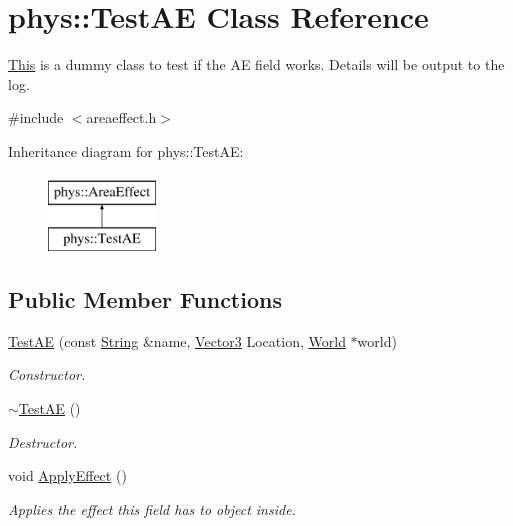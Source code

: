 \hypertarget{classphys_1_1TestAE}{
\section{phys::TestAE Class Reference}
\label{d1/dca/classphys_1_1TestAE}
}


\hyperlink{structThis}{This} is a dummy class to test if the AE field works. Details will be output to the log.  




{\ttfamily \#include $<$areaeffect.h$>$}

Inheritance diagram for phys::TestAE:\begin{figure}[H]
\begin{center}
\leavevmode
\includegraphics[height=2cm]{d1/dca/classphys_1_1TestAE}
\end{center}
\end{figure}
\subsection*{Public Member Functions}
\begin{DoxyCompactItemize}
\item 
\hyperlink{classphys_1_1TestAE_a90e5678a05179482d08fc9abd94fe9d6}{TestAE} (const \hyperlink{namespacephys_aa03900411993de7fbfec4789bc1d392e}{String} \&name, \hyperlink{classphys_1_1Vector3}{Vector3} Location, \hyperlink{classphys_1_1World}{World} $\ast$world)
\begin{DoxyCompactList}\small\item\em Constructor. \item\end{DoxyCompactList}\item 
\hyperlink{classphys_1_1TestAE_aa3ceb77df713b5cafa97495de61e4b0a}{$\sim$TestAE} ()
\begin{DoxyCompactList}\small\item\em Destructor. \item\end{DoxyCompactList}\item 
void \hyperlink{classphys_1_1TestAE_a191c60dbfa277e850ea392d9ab774c42}{ApplyEffect} ()
\begin{DoxyCompactList}\small\item\em Applies the effect this field has to object inside. \item\end{DoxyCompactList}\end{DoxyCompactItemize}


